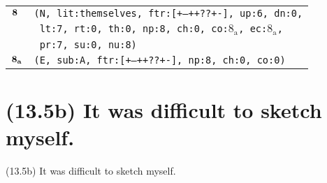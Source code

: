 \documentclass{article}
\begin{document}
\begin{minipage}{\textwidth}
{\begin{tabular}{|r|l|}
    ${\textbf{\textrm{8}}_{\phantom{z}}}$ & \texttt{\texttt{(N,~lit:themselves,~ftr:[+--++??+-],~up:6,~dn:0,}} \\
    & \texttt{\texttt{~lt:7,~rt:0,~th:0,~np:8,~ch:0,~co:${\textrm{8}_{\textrm{a}}}$,~ec:${\textrm{8}_{\textrm{a}}}$,}} \\
    & \texttt{\texttt{~pr:7,~su:0,~nu:8)}} \\
    ${\textbf{\textrm{8}}_{\textbf{\textrm{a}}}}$ & \texttt{\texttt{(E,~sub:A,~ftr:[+--++??+-],~np:8,~ch:0,~co:0)}} \\
    \hline
  \end{tabular}
  }
\end{minipage}
\bigbreak

\clearpage

%
%

\section*{(13.5b) It was difficult to sketch myself.}

\bigbreak
\begin{enumerate*}
\item[(13.5b)] It was difficult to sketch myself.
\end{enumerate*}
\bigbreak
\end{document}
